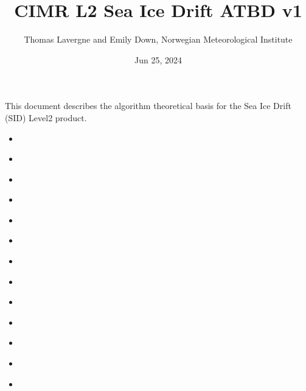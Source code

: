 \documentclass[letterpaper,10pt,english]{jupyterBook}
\title{CIMR L2 Sea Ice Drift ATBD v1}
\date{Jun 25, 2024}
\author{Thomas Lavergne and Emily Down, Norwegian Meteorological Institute}
\begin{document}
\pagestyle{empty}
\sphinxmaketitle
\pagestyle{plain}
\sphinxtableofcontents
\pagestyle{normal}
\label{\detokenize{intro::doc}}


\sphinxAtStartPar
This document describes the algorithm theoretical basis for the Sea Ice Drift (SID) Level\sphinxhyphen{}2 product.
\begin{itemize}
\item {} 
\sphinxAtStartPar
{\hyperref[\detokenize{abstract::doc}]{}}

\item {} 
\sphinxAtStartPar
{\hyperref[\detokenize{applicable_ref_docs::doc}]{}}

\item {} 
\sphinxAtStartPar
{\hyperref[\detokenize{acronyms::doc}]{}}

\item {} 
\sphinxAtStartPar
{\hyperref[\detokenize{definitions::doc}]{}}

\item {} 
\sphinxAtStartPar
{\hyperref[\detokenize{introduction_purpose_scope::doc}]{}}

\item {} 
\sphinxAtStartPar
{\hyperref[\detokenize{background_justification_algorithm::doc}]{}}

\item {} 
\sphinxAtStartPar
{\hyperref[\detokenize{L2_product_definition::doc}]{}}

\item {} 
\sphinxAtStartPar
{\hyperref[\detokenize{baseline_algorithm_definition::doc}]{}}

\item {} 
\sphinxAtStartPar
{\hyperref[\detokenize{algorithm_input_output_data_definition::doc}]{}}

\item {} 
\sphinxAtStartPar
{\hyperref[\detokenize{CIMR_L2_Sea_Ice_Drift_algorithm::doc}]{}}

\item {} 
\sphinxAtStartPar
{\hyperref[\detokenize{CIMR_L2_Sea_Ice_Drift_performanceAssessment::doc}]{}}

\item {} 
\sphinxAtStartPar
{\hyperref[\detokenize{roadmap_for_future_atbd_developments::doc}]{}}

\item {} 
\sphinxAtStartPar
{\hyperref[\detokenize{references::doc}]{}}

\end{itemize}
\end{document}
